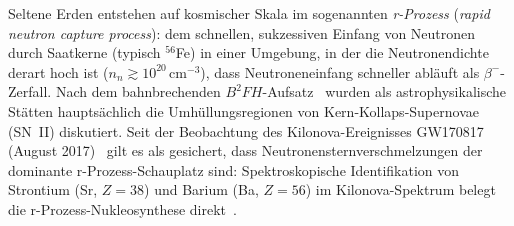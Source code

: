 ﻿\documentclass[12pt, a4paper]{report}
\theoremstyle{definition}
\theoremstyle{remark}
\begin{document}
Seltene Erden entstehen auf kosmischer Skala im sogenannten
\emph{r-Prozess} (\emph{rapid neutron capture process}): dem schnellen,
sukzessiven Einfang von Neutronen durch Saatkerne (typisch $^{56}$Fe) in
einer Umgebung, in der die Neutronendichte derart hoch ist
($n_n \gtrsim 10^{20}\,\text{cm}^{-3}$), dass Neutroneneinfang schneller
abläuft als $\beta^-$-Zerfall. Nach dem bahnbrechenden
$B^2FH$-Aufsatz~\cite{burbidge1957} wurden als astrophysikalische
Stätten hauptsächlich die Umhüllungsregionen von Kern-Kollaps-Supernovae
(SN~II) diskutiert. Seit der Beobachtung des Kilonova-Ereignisses GW170817
(August 2017)~\cite{abbott2016} gilt es als gesichert, dass
Neutronensternverschmelzungen der dominante r-Prozess-Schauplatz sind:
Spektroskopische Identifikation von Strontium (Sr, $Z = 38$) und Barium
(Ba, $Z = 56$) im Kilonova-Spektrum belegt die r-Prozess-Nukleosynthese
direkt~\cite{smartt2017}.
\end{document}
